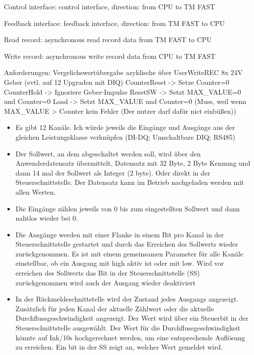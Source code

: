 Control interface: control interface, direction: from CPU to TM FAST 

Feedback interface: feedback interface, direction: from TM FAST to CPU 

Read record: asynchronous read record data from TM FAST to CPU  

Write record: asynchronous write record data from CPU to TM FAST 

Anforderungen:
Vergelichswertübergabe azyklische über UserWriteREC
8x 24V Geber (evtl. auf 12 Upgraden mit DIQ)
CounterReset -> Setze Counter=0
CounterHold -> Ignoriere Geber-Impulse
ResetSW -> Setzt MAX\_VALUE=0 und Counter=0
Load -> Setzt MAX\_VALUE und Counter=0 (Muss, weil wenn MAX\_VALUE > Counter kein Fehler (Der nutzer darf dafür nict einbüßen))

\begin{itemize}
    \item Es gibt 12 Kanäle. Ich würde jeweils die Eingänge und Ausgänge aus der gleichen Leistungsklasse verknüpfen (DI-DQ; Umschaltbare DIQ; RS485)
    \item Der Sollwert, an dem abgeschaltet werden soll, wird über den Anwenderdatensatz übermittelt, Datensatz mit 32 Byte, 2 Byte Kennung und dann 14 mal der Sollwert als Integer (2 byte). Oder direkt in der Steuerschnittstelle. Der Datensatz kann im Betrieb nachgeladen werden mit allen Werten.
    \item Die Eingänge zählen jeweils von 0 bis zum eingestellten Sollwert und dann nahtlos wieder bei 0. 
    \item Die Ausgänge werden mit einer Flanke in einem Bit pro Kanal in der Steuerschnittstelle gestartet und durch das Erreichen des Sollwerts wieder zurückgenommen. Es ist mit einem gemeinsamen Parameter für alle Kanäle einstellbar, ob ein Ausgang mit high aktiv ist oder mit low. Wird vor erreichen des Sollwerts das Bit in der Steuerschnittstelle (SS) zurückgenommen wird auch der Ausgang wieder deaktiviert
    \item In der Rückmeldeschnittstelle wird der Zustand jedes Ausgangs angezeigt. Zusätzlich für jeden Kanal der aktuelle Zählwert oder die aktuelle Durchflussgeschwindigkeit angezeigt. Der Wert wird über ein Steuerbit in der Steuerschnittstelle ausgewählt. Der Wert für die Durchflussgeschwindigkeit könnte auf Ink/10s hochgerechnet werden, um eine entsprechende Auflösung zu erreichen.
    Ein bit in der SS zeigt an, welcher Wert gemeldet wird.
\end{itemize}

